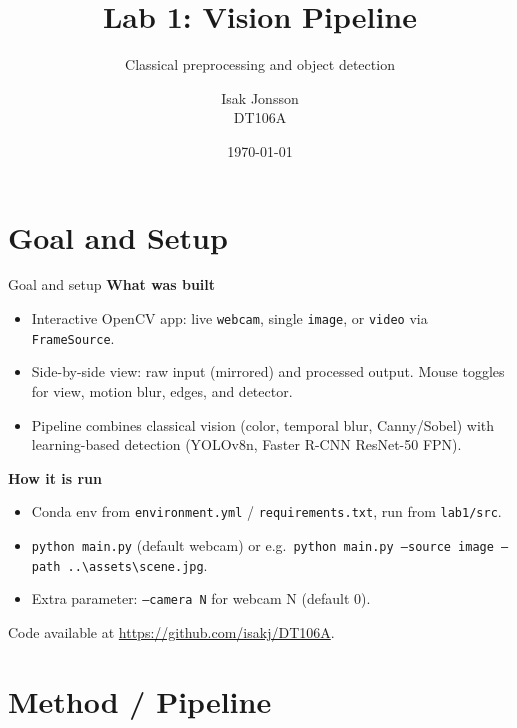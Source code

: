 \documentclass[aspectratio=169]{beamer}
\title{Lab 1: Vision Pipeline}
\subtitle{Classical preprocessing and object detection}
\author{Isak Jonsson \\ DT106A}
\date{\today}
\begin{document}
\begin{frame}
  \titlepage
\end{frame}

\section{Goal and Setup}

\begin{frame}{Goal and setup}
  \textbf{What was built}
  \begin{itemize}
    \item Interactive OpenCV app: live \texttt{webcam}, single \texttt{image}, or \texttt{video} via \texttt{FrameSource}.
    \item Side-by-side view: raw input (mirrored) and processed output. Mouse toggles for view, motion blur, edges, and detector.
    \item Pipeline combines classical vision (color, temporal blur, Canny/Sobel) with learning-based detection (YOLOv8n, Faster R-CNN ResNet-50 FPN).
  \end{itemize}
  \vspace{0.5em}
  \textbf{How it is run}
  \begin{itemize}
    \item Conda env from \texttt{environment.yml} / \texttt{requirements.txt}, run from \texttt{lab1/src}.
    \item \texttt{python main.py} (default webcam) or e.g.\ \texttt{python main.py --source image --path ..\textbackslash assets\textbackslash scene.jpg}.
    \item Extra parameter: \texttt{--camera N} for webcam N (default 0).
  \end{itemize}
  Code available at \url{https://github.com/isakj/DT106A}.
\end{frame}

\section{Method / Pipeline}
\end{document}
